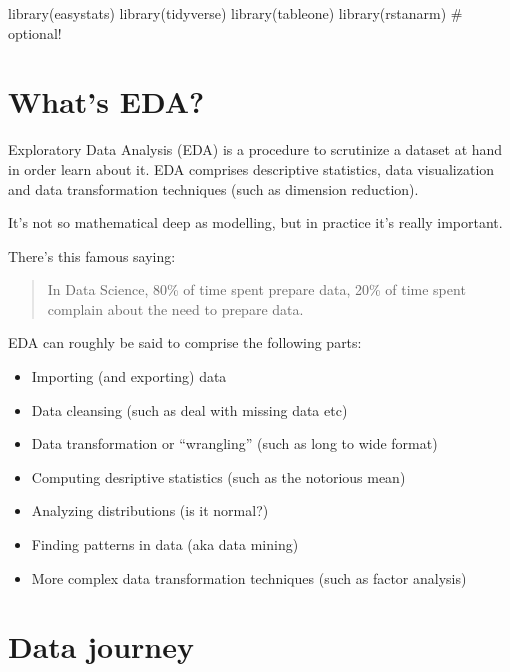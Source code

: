 \documentclass[
  letterpaper,
  DIV=11,
  numbers=noendperiod]{scrreprt}
\newenvironment{Shaded}{\begin{snugshade}}{\end{snugshade}}
\newcommand{\CommentTok}[1]{\textcolor[rgb]{0.37,0.37,0.37}{#1}}
\newcommand{\FunctionTok}[1]{\textcolor[rgb]{0.28,0.35,0.67}{#1}}
\newcommand{\NormalTok}[1]{\textcolor[rgb]{0.00,0.23,0.31}{#1}}
\providecommand{\tightlist}{%
  \setlength{\itemsep}{0pt}\setlength{\parskip}{0pt}}\usepackage{longtable,booktabs,array}
\theoremstyle{definition}
\theoremstyle{definition}
\theoremstyle{remark}
\begin{document}
\begin{Shaded}
\begin{Highlighting}[]
\FunctionTok{library}\NormalTok{(easystats)}
\FunctionTok{library}\NormalTok{(tidyverse)}
\FunctionTok{library}\NormalTok{(tableone)}
\FunctionTok{library}\NormalTok{(rstanarm)  }\CommentTok{\# optional!}
\end{Highlighting}
\end{Shaded}

\hypertarget{whats-eda}{%
\section{What's EDA?}\label{whats-eda}}

Exploratory Data Analysis (EDA) is a procedure to scrutinize a dataset
at hand in order learn about it. EDA comprises descriptive statistics,
data visualization and data transformation techniques (such as dimension
reduction).

It's not so mathematical deep as modelling, but in practice it's really
important.

There's this famous saying:

\begin{quote}
In Data Science, 80\% of time spent prepare data, 20\% of time spent
complain about the need to prepare data.
\end{quote}

EDA can roughly be said to comprise the following parts:

\begin{itemize}
\tightlist
\item
  Importing (and exporting) data
\item
  Data cleansing (such as deal with missing data etc)
\item
  Data transformation or ``wrangling'' (such as long to wide format)
\item
  Computing desriptive statistics (such as the notorious mean)
\item
  Analyzing distributions (is it normal?)
\item
  Finding patterns in data (aka data mining)
\item
  More complex data transformation techniques (such as factor analysis)
\end{itemize}

\hypertarget{sec-data-journey}{%
\section{Data journey}\label{sec-data-journey}}
\end{document}
